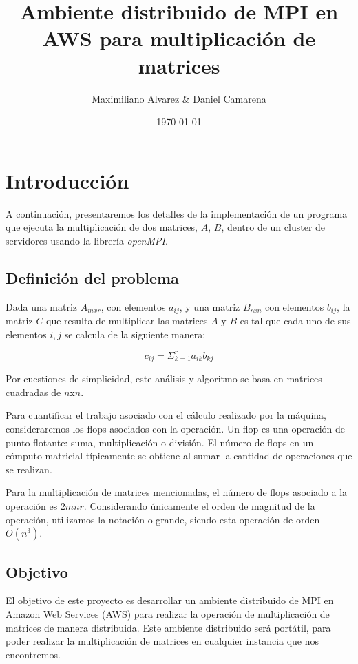 \documentclass[DIV=calc, paper=letter, fontsize=11pt, twocolumn]{scrartcl}
\title{\Huge Ambiente distribuido de MPI en AWS para multiplicación de matrices}
\author{    Maximiliano Alvarez
            \& 
            Daniel Camarena }
\date{\today}
\begin{document}
\maketitle

\thispagestyle{fancy}


\section{Introducción}
A continuación, presentaremos los detalles de la implementación de un programa que ejecuta la multiplicación de dos matrices, $A$, $B$, dentro de un cluster de servidores usando la librería \textit{openMPI}.

\subsection{Definición del problema}

Dada una matriz $A_{mxr}$, con elementos $a_{ij}$, y una matriz $B_{rxn}$ con elementos $b_{ij}$, la matriz $C$ que resulta de multiplicar las matrices $A$ y $B$ es tal que cada uno de sus elementos $i,j$ se calcula de la siguiente manera:

\begin{equation}
    c_{ij}=\Sigma_{k=1}^ra_{ik}b_{kj}
\end{equation}

Por cuestiones de simplicidad, este análisis y algoritmo se basa en matrices cuadradas de $n$x$n$.

Para cuantificar el trabajo asociado con el cálculo realizado por la máquina, consideraremos los flops asociados con la operación. Un flop es una operación de punto flotante: suma, multiplicación o división. El número de flops en un cómputo matricial típicamente se obtiene al sumar la cantidad de operaciones que se realizan.

Para la multiplicación de matrices mencionadas, el número de flops asociado a la operación es $2mnr$. Considerando únicamente el orden de magnitud de la operación, utilizamos la notación o grande, siendo esta operación de orden $O(n^3)$.

\subsection{Objetivo}

El objetivo de este proyecto es desarrollar un ambiente distribuido de MPI en Amazon Web Services (AWS) para realizar la operación de multiplicación de matrices de manera distribuida. Este ambiente distribuido será portátil, para poder realizar la multiplicación de matrices en cualquier instancia que nos encontremos.
\end{document}
